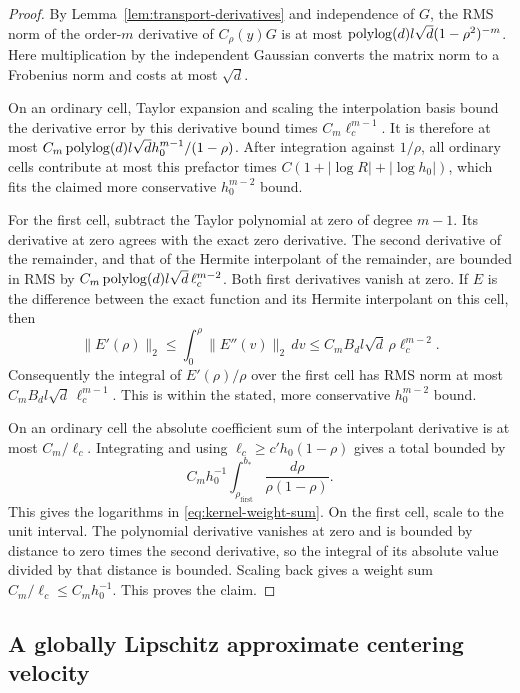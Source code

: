 \begin{proof}
By Lemma~\ref{lem:transport-derivatives} and independence of $G$,
the RMS norm of the order-$m$ derivative of $C_\rho(y)G$ is at most
$\operatorname{polylog}(d)l\sqrt d(1-\rho^2)^{-m}$.  Here multiplication by the
independent Gaussian converts the matrix norm to a Frobenius norm and
costs at most $\sqrt d$.

On an ordinary cell, Taylor expansion and scaling the interpolation
basis bound the derivative error by this derivative bound times
$C_m\ell_c^{m-1}$.  It is therefore at most
$C_m\operatorname{polylog}(d)l\sqrt d h_0^{m-1}/(1-\rho)$.
After integration against $1/\rho$, all ordinary cells contribute at
most this prefactor times
$C(1+|\log R|+|\log h_0|)$, which fits the claimed more conservative
$h_0^{m-2}$ bound.

For the first cell, subtract the Taylor polynomial at zero of degree
$m-1$.  Its derivative at zero agrees with the exact zero derivative.
The second derivative of the remainder, and that of the Hermite
interpolant of the remainder, are bounded in RMS by
$C_m\operatorname{polylog}(d)l\sqrt d\,\ell_c^{m-2}$.  Both first derivatives
vanish at zero.  If $E$ is the difference between the exact function
and its Hermite interpolant on this cell, then
\[
 \|E'(\rho)\|_2
 \le\int_0^\rho\|E''(v)\|_2\,dv
 \le C_mB_dl\sqrt d\,\rho\ell_c^{m-2}.
\]
Consequently the integral of $E'(\rho)/\rho$ over the first cell
has RMS norm at most $C_mB_dl\sqrt d\,\ell_c^{m-1}$.
This is within the stated, more conservative $h_0^{m-2}$ bound.

On an ordinary cell the absolute coefficient sum of the interpolant
derivative is at most $C_m/\ell_c$.  Integrating and using
$\ell_c\ge c'h_0(1-\rho)$ gives a total bounded by
\[
 C_mh_0^{-1}\int_{\rho_{\mathrm{first}}}^{b_*}
                   \frac{d\rho}{\rho(1-\rho)}.
\]
This gives the logarithms in \eqref{eq:kernel-weight-sum}.
On the first cell, scale to the unit interval.  The polynomial
derivative vanishes at zero and is bounded by distance to zero times
the second derivative, so the integral of its absolute value divided
by that distance is bounded.  Scaling back gives a weight sum
$C_m/\ell_c\le C_mh_0^{-1}$.  This proves the claim.
\end{proof}

\subsection{A globally Lipschitz approximate centering velocity}

